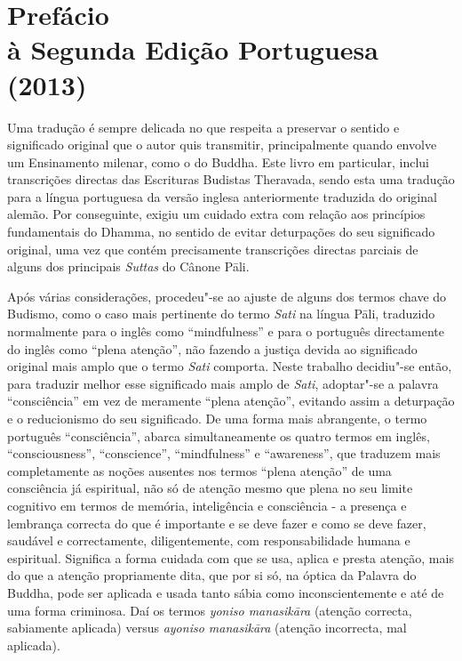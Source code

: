 \chapter[Prefácio à Segunda Edição Portuguesa (2013)]{Prefácio\\ à Segunda Edição Portuguesa\\ (2013)}

Uma tradução é sempre delicada no que respeita a preservar o sentido e
significado original que o autor quis transmitir, principalmente quando envolve
um Ensinamento milenar, como o do Buddha. Este livro em particular, inclui
transcrições directas das Escrituras Budistas Theravada, sendo esta uma tradução
para a língua portuguesa da versão inglesa anteriormente traduzida do original
alemão. Por conseguinte, exigiu um cuidado extra com relação aos princípios
fundamentais do Dhamma, no sentido de evitar deturpações do seu significado
original, uma vez que contém precisamente transcrições directas parciais de
alguns dos principais \emph{Suttas} do Cânone Pāli.

Após várias considerações, procedeu"-se ao ajuste de alguns dos termos chave do
Budismo, como o caso mais pertinente do termo \emph{Sati} na língua Pāli,
traduzido normalmente para o inglês como “mindfulness” e para o português
directamente do inglês como “plena atenção”, não fazendo a justiça devida ao
significado original mais amplo que o termo \emph{Sati} comporta. Neste trabalho
decidiu"-se então, para traduzir melhor esse significado mais amplo de
\emph{Sati}, adoptar"-se a palavra “consciência” em vez de meramente “plena
atenção”, evitando assim a deturpação e o reducionismo do seu significado. De
uma forma mais abrangente, o termo português “consciência”, abarca
simultaneamente os quatro termos em inglês, “consciousness”, “conscience”,
“mindfulness” e “awareness”, que traduzem mais completamente as noções
ausentes nos termos “plena atenção” de uma consciência já espiritual, não só
de atenção mesmo que plena no seu limite cognitivo em termos de memória,
inteligência e consciência - a presença e lembrança correcta do que é importante
e se deve fazer e como se deve fazer, saudável e correctamente, diligentemente,
com responsabilidade humana e espiritual. Significa a forma cuidada com que se
usa, aplica e presta atenção, mais do que a atenção propriamente dita, que por
si só, na óptica da Palavra do Buddha, pode ser aplicada e usada tanto sábia
como inconscientemente e até de uma forma criminosa. Daí os termos \emph{yoniso
  manasikāra} (atenção correcta, sabiamente aplicada) versus \emph{ayoniso
  manasikāra} (atenção incorrecta, mal aplicada).

